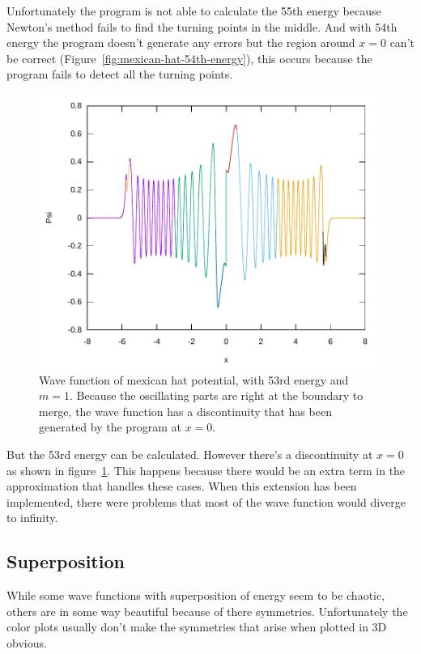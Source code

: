 \documentclass[11pt,DIV=10,final]{scrreprt} %
\begin{document}
\begin{minipage}{\textwidth}
  Unfortunately the program is not able to calculate the 55th energy because Newton's method fails to find the turning points in the middle. And with 54th energy the program doesn't generate any errors
  but the region around $x = 0$ can't be correct (Figure~\ref{fig:mexican-hat-54th-energy}), this occurs because the program fails to detect all the turning points.

\begin{figure}[H]
  \centering
  \includegraphics[width=\textwidth]{plots/mexican-hat-53.pdf}
  \caption{
    Wave function of mexican hat potential, with 53rd energy and $m = 1$. Because the oscillating parts are right at the boundary to merge, the wave function has a discontinuity that has been generated by the program at $x = 0$.
  }\label{fig:mexican-hat-53rd-energy}
\end{figure}
But the 53rd energy can be calculated. However there's a discontinuity at $x = 0$ as shown in figure~\ref{fig:mexican-hat-53rd-energy}. This happens because there would be an extra term in the
approximation that handles these cases. When this extension has been implemented, there were problems that most of the wave function would diverge to infinity.
\end{minipage}

\subsection{Superposition}
While some wave functions with superposition of energy seem to be chaotic, others are in some way beautiful because of there symmetries.
Unfortunately the color plots usually don't make the symmetries that arise when plotted in 3D obvious.
\end{document}
